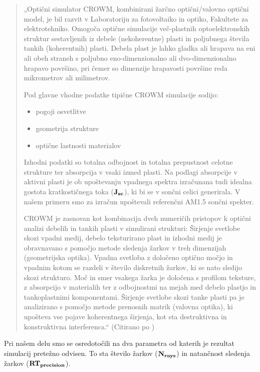 \documentclass[a4paper,twoside,openright,12pt,slovene]{book}
\begin{document}
\begin{quote}
„Optični simulator CROWM, kombinirani žarčno optični/valovno optični model, je bil razvit v Laboratoriju za fotovoltaiko in optiko, Fakultete za elektrotehniko. Omogoča optične simulacije več-plastnih optoelektronskih struktur sestavljenih iz debele (nekoherentne) plasti in poljubnega števila tankih (koherentnih) plasti. Debela plast je lahko gladka ali hrapava na eni ali obeh straneh s poljubno eno-dimenzionalno ali dvo-dimenzionalno hrapavo površino, pri čemer so dimenzije hrapavosti površine reda mikrometrov ali milimetrov.

Pod glavne vhodne podatke tipične CROWM simulacije sodijo:

\begin{itemize}
    \item pogoji osvetlitve
    \item geometrija strukture
    \item optične lastnosti materialov
\end{itemize}

Izhodni podatki so totalna odbojnost in totalna prepustnost celotne strukture ter absorpcija v vsaki izmed plasti. Na podlagi absorpcije v aktivni plasti je ob upoštevanju vpadnega spektra izračunana tudi idealna gostota kratkostičnega toka ($\bf J_{sc}$), ki bi se v sončni celici generirala. V našem primeru smo za izračun upoštevali referenčni AM1.5 sončni spekter.

CROWM je zasnovan kot kombinacija dveh numeričih pristopov k optični analizi debelih in tankih plasti v simulirani strukturi: Širjenje svetlobe skozi vpadni medij, debelo teksturirano plast in izhodni medij je obravnavano s pomočjo metode sledenja žarkov v treh dimenzijah (geometrijska optika). Vpadna svetloba z določeno optično močjo in vpadnim kotom se razdeli v število diskretnih žarkov, ki se nato sledijo skozi strukturo. Moč in smer vsakega žarka je določena s profilom teksture, z absorpcijo v materialih ter z odbojnostmi na mejah med debelo plastjo in tankoplastnimi komponentami. Širjenje svetlobe skozi tanke plasti pa je analizirano s pomočjo metode prenosnih matrik (valovna optika), ki upošteva vse pojave koherentnega širjenja, kot sta destruktivna in konstruktivna interferenca.“ (Citirano po \cite{web_page}) \cite{ISSN0352-9045}   
\end{quote} 

Pri našem delu smo se osredotočili na dva parametra od katerih je rezultat simulacij pretežno odvisen. To sta število žarkov ($\bf N_{rays}$) in natančnost sledenja žarkov ($\bf RT_{precision}$).
\end{document}
